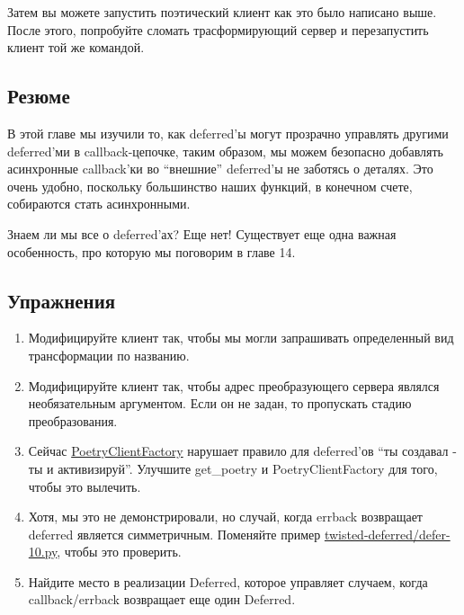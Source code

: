 
Затем вы можете запустить поэтический клиент как это было 
написано выше. После этого, попробуйте сломать трасформирующий сервер и 
перезапустить клиент той же командой.


\subsection{Резюме}


В этой главе мы изучили то, как deferred'ы могут 
прозрачно управлять другими deferred'ми в callback-цепочке, 
таким образом, мы можем безопасно добавлять асинхронные 
callback'ки во ``внешние'' deferred'ы не заботясь о деталях. 
Это очень удобно, поскольку большинство наших функций, 
в конечном счете, собираются стать асинхронными. 


Знаем ли мы все о deferred'ах? Еще нет! Существует еще 
одна важная особенность, про которую мы поговорим в главе 14.


\subsection{Упражнения}

\begin{enumerate}

\item Модифицируйте клиент так, чтобы мы могли запрашивать определенный 
вид трансформации по названию.

\item Модифицируйте клиент так, чтобы адрес преобразующего сервера 
являлся необязательным аргументом. Если он не задан, то пропускать стадию 
преобразования.

\item Сейчас \href{http://github.com/jdavisp3/twisted-intro/blob/master/twisted-client-6/get-poetry.py#L67}{PoetryClientFactory} 
нарушает правило для deferred'ов  
``ты создавал - ты и активизируй''. Улучшите get\_poetry и 
PoetryClientFactory для того, чтобы это вылечить.

\item Хотя, мы это не демонстрировали, но случай, когда errback возвращает 
deferred является симметричным. Поменяйте пример 
\href{http://github.com/jdavisp3/twisted-intro/blob/master/twisted-deferred/defer-10.py#L1}{twisted-deferred/defer-10.py}, чтобы это проверить.

\item Найдите место в реализации Deferred, которое управляет 
случаем, когда callback/errback возвращает еще один Deferred.

\end{enumerate}


